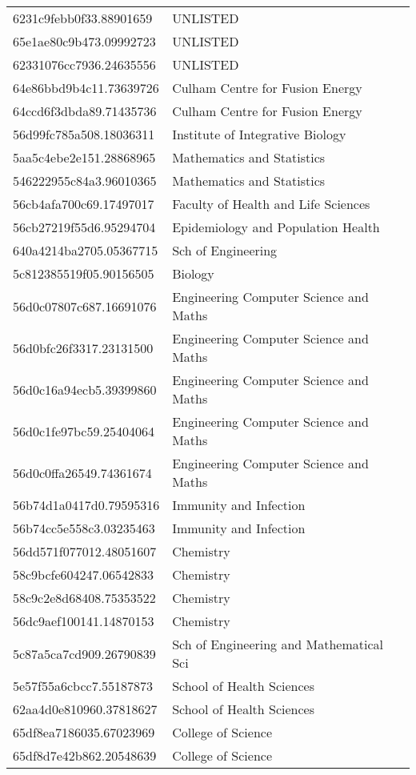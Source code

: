 \begin{tabular}{ll}
6231c9febb0f33.88901659 & UNLISTED \\
65e1ae80c9b473.09992723 & UNLISTED \\
62331076cc7936.24635556 & UNLISTED \\
64e86bbd9b4c11.73639726 & Culham Centre for Fusion Energy \\
64ccd6f3dbda89.71435736 & Culham Centre for Fusion Energy \\
56d99fc785a508.18036311 & Institute of Integrative Biology \\
5aa5c4ebe2e151.28868965 & Mathematics and Statistics \\
546222955c84a3.96010365 & Mathematics and Statistics \\
56cb4afa700c69.17497017 & Faculty of Health and Life Sciences \\
56cb27219f55d6.95294704 & Epidemiology and Population Health \\
640a4214ba2705.05367715 & Sch of Engineering \\
5c812385519f05.90156505 & Biology \\
56d0c07807c687.16691076 & Engineering Computer Science and Maths \\
56d0bfc26f3317.23131500 & Engineering Computer Science and Maths \\
56d0c16a94ecb5.39399860 & Engineering Computer Science and Maths \\
56d0c1fe97bc59.25404064 & Engineering Computer Science and Maths \\
56d0c0ffa26549.74361674 & Engineering Computer Science and Maths \\
56b74d1a0417d0.79595316 & Immunity and Infection \\
56b74cc5e558c3.03235463 & Immunity and Infection \\
56dd571f077012.48051607 & Chemistry \\
58c9bcfe604247.06542833 & Chemistry \\
58c9c2e8d68408.75353522 & Chemistry \\
56dc9aef100141.14870153 & Chemistry \\
5c87a5ca7cd909.26790839 & Sch of Engineering and Mathematical Sci \\
5e57f55a6cbcc7.55187873 & School of Health Sciences \\
62aa4d0e810960.37818627 & School of Health Sciences \\
65df8ea7186035.67023969 & College of Science \\
65df8d7e42b862.20548639 & College of Science \\

\end{tabular}
